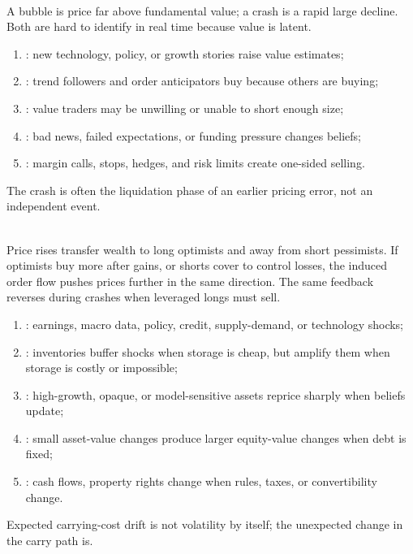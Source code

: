 \documentclass[a4paper,oneside,openany]{book}
\begin{document}
\begin{definition} \\
A bubble is price far above fundamental value; a crash is a rapid large decline. Both are hard to identify in real time because value is latent.
\end{definition}

\begin{taxonomy} 
\begin{enumerate}[label=\roman*.]
\setlength{\itemsep}{0pt}
\item {}: new technology, policy, or growth stories raise value estimates;
\item {}: trend followers and order anticipators buy because others are buying;
\item {}: value traders may be unwilling or unable to short enough size;
\item {}: bad news, failed expectations, or funding pressure changes beliefs;
\item {}: margin calls, stops, hedges, and risk limits create one-sided selling.
\end{enumerate}
The crash is often the liquidation phase of an earlier pricing error, not an independent event.
\end{taxonomy}

\begin{mechanism} \\
Price rises transfer wealth to long optimists and away from short pessimists. If optimists buy more after gains, or shorts cover to control losses, the induced order flow pushes prices further in the same direction. The same feedback reverses during crashes when leveraged longs must sell.
\end{mechanism}

\begin{taxonomy} 
\begin{enumerate}[label=\roman*.]
\setlength{\itemsep}{0pt}
\item {}: earnings, macro data, policy, credit, supply-demand, or technology shocks;
\item {}: inventories buffer shocks when storage is cheap, but amplify them when storage is costly or impossible;
\item {}: high-growth, opaque, or model-sensitive assets reprice sharply when beliefs update;
\item {}: small asset-value changes produce larger equity-value changes when debt is fixed;
\item {}: cash flows, property rights change when rules, taxes, or convertibility change.
\end{enumerate}
Expected carrying-cost drift is not volatility by itself; the unexpected change in the carry path is.
\end{taxonomy}
\end{document}
